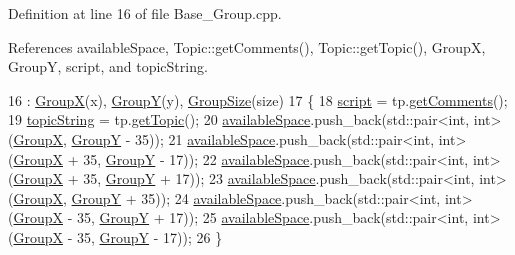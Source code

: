 Definition at line 16 of file Base\+\_\+\+Group.\+cpp.



References available\+Space, Topic\+::get\+Comments(), Topic\+::get\+Topic(), GroupX, GroupY, script, and topic\+String.


\begin{DoxyCode}
16                                                                                                            
                 : \hyperlink{class_base___group_a039388ca2feb6e676829839d9a3ff543}{GroupX}(x), \hyperlink{class_base___group_adf6cb605c43eaa82f21150e84c629e17}{GroupY}(y), \hyperlink{class_base___group_a44130e3b109f8fb9fb0142fda2a67b07}{GroupSize}(size)
17 \{
18     \hyperlink{class_base___group_a98fbcb0bb85a488e29db9465c18715cc}{script} = tp.\hyperlink{class_topic_ac800190b0f4f8ee514255cc75bce1f13}{getComments}();
19     \hyperlink{class_base___group_a20e1ca90be1f271bf2256021d6325dfa}{topicString} = tp.\hyperlink{class_topic_a9f6ad6642112c5f121a92aceb8df9c43}{getTopic}();
20     \hyperlink{class_base___group_a8eb46d3107d53da0f5fbea2410b4b095}{availableSpace}.push\_back(std::pair<int, int>(\hyperlink{class_base___group_a039388ca2feb6e676829839d9a3ff543}{GroupX}, 
      \hyperlink{class_base___group_adf6cb605c43eaa82f21150e84c629e17}{GroupY} - 35));
21     \hyperlink{class_base___group_a8eb46d3107d53da0f5fbea2410b4b095}{availableSpace}.push\_back(std::pair<int, int>(\hyperlink{class_base___group_a039388ca2feb6e676829839d9a3ff543}{GroupX} + 35, 
      \hyperlink{class_base___group_adf6cb605c43eaa82f21150e84c629e17}{GroupY} - 17));
22     \hyperlink{class_base___group_a8eb46d3107d53da0f5fbea2410b4b095}{availableSpace}.push\_back(std::pair<int, int>(\hyperlink{class_base___group_a039388ca2feb6e676829839d9a3ff543}{GroupX} + 35, 
      \hyperlink{class_base___group_adf6cb605c43eaa82f21150e84c629e17}{GroupY} + 17));
23     \hyperlink{class_base___group_a8eb46d3107d53da0f5fbea2410b4b095}{availableSpace}.push\_back(std::pair<int, int>(\hyperlink{class_base___group_a039388ca2feb6e676829839d9a3ff543}{GroupX}, 
      \hyperlink{class_base___group_adf6cb605c43eaa82f21150e84c629e17}{GroupY} + 35));
24     \hyperlink{class_base___group_a8eb46d3107d53da0f5fbea2410b4b095}{availableSpace}.push\_back(std::pair<int, int>(\hyperlink{class_base___group_a039388ca2feb6e676829839d9a3ff543}{GroupX} - 35, 
      \hyperlink{class_base___group_adf6cb605c43eaa82f21150e84c629e17}{GroupY} + 17));
25     \hyperlink{class_base___group_a8eb46d3107d53da0f5fbea2410b4b095}{availableSpace}.push\_back(std::pair<int, int>(\hyperlink{class_base___group_a039388ca2feb6e676829839d9a3ff543}{GroupX} - 35, 
      \hyperlink{class_base___group_adf6cb605c43eaa82f21150e84c629e17}{GroupY} - 17));
26 \}
\end{DoxyCode}


